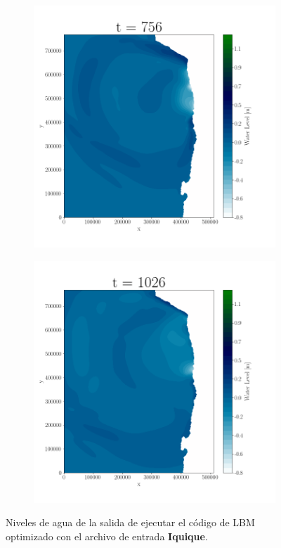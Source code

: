 \begin{figure}[H]
\begin{subfigure}[b]{.4\linewidth}
\includegraphics[width=\linewidth]{Figures/1-5.png}
\caption{}
\end{subfigure}
\begin{subfigure}[b]{.4\linewidth}
\includegraphics[width=\linewidth]{Figures/1-6.png}
\caption{}
\end{subfigure}


\caption{Niveles de agua de la salida de ejecutar el código de LBM optimizado con el archivo de entrada \textbf{Iquique}.}
\label{fig:20}
\end{figure}

